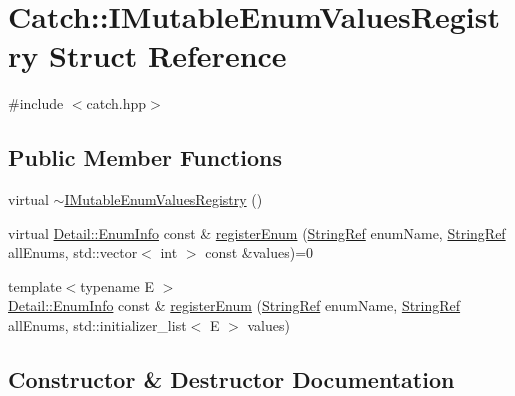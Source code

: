 \hypertarget{struct_catch_1_1_i_mutable_enum_values_registry}{}\section{Catch\+::I\+Mutable\+Enum\+Values\+Registry Struct Reference}
\label{struct_catch_1_1_i_mutable_enum_values_registry}


{\ttfamily \#include $<$catch.\+hpp$>$}

\subsection*{Public Member Functions}
\begin{DoxyCompactItemize}
\item 
virtual \mbox{\hyperlink{struct_catch_1_1_i_mutable_enum_values_registry_aebd423693128987c89ac732478d74673}{$\sim$\+I\+Mutable\+Enum\+Values\+Registry}} ()
\item 
virtual \mbox{\hyperlink{struct_catch_1_1_detail_1_1_enum_info}{Detail\+::\+Enum\+Info}} const  \& \mbox{\hyperlink{struct_catch_1_1_i_mutable_enum_values_registry_a948e66e85f5b66ab68256d50bfe548f4}{register\+Enum}} (\mbox{\hyperlink{class_catch_1_1_string_ref}{String\+Ref}} enum\+Name, \mbox{\hyperlink{class_catch_1_1_string_ref}{String\+Ref}} all\+Enums, std\+::vector$<$ int $>$ const \&values)=0
\item 
{\footnotesize template$<$typename E $>$ }\\\mbox{\hyperlink{struct_catch_1_1_detail_1_1_enum_info}{Detail\+::\+Enum\+Info}} const  \& \mbox{\hyperlink{struct_catch_1_1_i_mutable_enum_values_registry_a60e4546c6fd45f9be68e43410403b562}{register\+Enum}} (\mbox{\hyperlink{class_catch_1_1_string_ref}{String\+Ref}} enum\+Name, \mbox{\hyperlink{class_catch_1_1_string_ref}{String\+Ref}} all\+Enums, std\+::initializer\+\_\+list$<$ E $>$ values)
\end{DoxyCompactItemize}


\subsection{Constructor \& Destructor Documentation}
\mbox{\label{struct_catch_1_1_i_mutable_enum_values_registry_aebd423693128987c89ac732478d74673}} 
